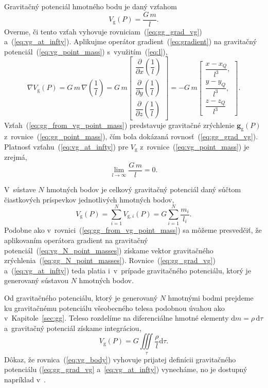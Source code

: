 \documentclass[a4paper,12pt]{book}
\newcommand{\diff}{\mathrm d}
\newcommand{\gidx}{\mathrm g}
\let\vec\mathbf
\begin{document}
Gravitačný potenciál hmotného bodu je daný vzťahom
%
\begin{equation}
\label{eq:vg_point_mass}
V_\gidx(P) = \frac{G \, m}{l}{.}
\end{equation}
%
Overme, či tento vzťah vyhovuje rovniciam~(\ref{eq:gg_grad_vg})
a~(\ref{eq:vg_at_infty}).  Aplikujme operátor gradient~(\ref{eq:gradient})
na gravitačný potenciál~(\ref{eq:vg_point_mass}) s~využitím~(\ref{eq:l}),
%
\begin{equation}
\label{eq:gg_from_vg_point_mass}
\nabla V_\gidx(P) = G \, m \, \nabla \left( \frac{1}{l} \right) =
%
G \, m
\begin{bmatrix}
\dfrac{\partial}{\partial x} \left( \dfrac{1}{l} \right)\\[2ex]
\dfrac{\partial}{\partial y} \left( \dfrac{1}{l} \right)\\[2ex]
\dfrac{\partial}{\partial z} \left( \dfrac{1}{l} \right)
\end{bmatrix}
%
=
%
-G \, m
%
\begin{bmatrix}
\dfrac{x - x_Q}{l^3}{,}\\[2ex]
\dfrac{y - y_Q}{l^3}{,}\\[2ex]
\dfrac{z - z_Q}{l^3}
\end{bmatrix}
{.}
\end{equation}
%
Vzťah~(\ref{eq:gg_from_vg_point_mass}) predstavuje gravitačné zrýchlenie $\vec 
g_\gidx(P)$ z~rovnice~(\ref{eq:gg_point_mass}), čím bola dokázaná 
rovnosť~(\ref{eq:gg_grad_vg}).  Platnosť vzťahu~(\ref{eq:vg_at_infty}) pre 
$V_\gidx$ z~rovnice~(\ref{eq:vg_point_mass}) je zrejmá,
%
\begin{equation}
\lim_{l \to \infty} \frac{G \, m}{l} = 0{.}
\end{equation}

V~sústave $N$ hmotných bodov je celkový gravitačný potenciál daný súčtom
čiastkových príspevkov jednotlivých hmotných bodov,
%
\begin{equation}
\label{eq:vg_N_point_masses}
V_\gidx(P) = \sum_{i = 1}^{N} V_{\gidx,i}(P) = G \sum_{i = 1}^{N}\frac{
m_i}{l_i}{.}
\end{equation}
%
Podobne ako v~rovnici~(\ref{eq:gg_from_vg_point_mass}) sa môžeme presvedčiť, že 
aplikovaním operátora gradient na gravitačný
potenciál~(\ref{eq:vg_N_point_masses}) získame vektor gravitačného
zrýchlenia~(\ref{eq:gg_N_point_masses}).  Rovnice~(\ref{eq:gg_grad_vg}) 
a~(\ref{eq:vg_at_infty}) teda platia i~v~prípade gravitačného
potenciálu, ktorý je generovaný sústavou $N$ hmotných bodov.

Od gravitačného potenciálu, ktorý je generovaný $N$ hmotnými bodmi prejdeme ku
gravitačnému potenciálu všeobecného telesa podobnou úvahou ako
v~Kapitole~\ref{sec:gg}.  Teleso rozdelíme na diferenciálne hmotné elementy
$\diff m = \rho \, \diff \tau$ a~gravitačný potenciál získame integráciou,
%
\begin{equation}
\label{eq:vg_body}
V_\gidx(P) = G \iiint\limits_{\tau} \frac{\rho}{l} \diff\tau{.}
\end{equation}
%
Dôkaz, že rovnica~(\ref{eq:vg_body}) vyhovuje prijatej definícii gravitačného
potenciálu (\ref{eq:gg_grad_vg} a~\ref{eq:vg_at_infty}) vynecháme, no je
dostupný napríklad v~\textcite{MacMillan1930}.
\end{document}
